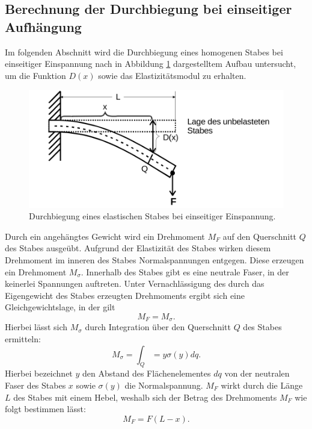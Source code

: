 \subsection{Berechnung der Durchbiegung bei einseitiger Aufhängung}
\label{sec:einseitigg}
Im folgenden Abschnitt wird die Durchbiegung eines homogenen Stabes bei einseitiger
Einspannung nach in Abbildung \ref{fig:einseitig} dargestelltem Aufbau untersucht,
um die Funktion $D(x)$ sowie das Elastizitätsmodul zu erhalten.
\begin{figure}[H]
  \centering
  \includegraphics[scale=0.4]{content/EinspannungEinseitig.png}
  \caption{Durchbiegung eines elastischen Stabes bei einseitiger Einspannung.}
  \label{fig:einseitig}
\end{figure}
\noindent
Durch ein angehängtes Gewicht wird ein Drehmoment $M_F$ auf den Querschnitt $Q$ des
Stabes ausgeübt. Aufgrund der Elastizität des Stabes wirken diesem Drehmoment im
inneren des Stabes Normalspannungen entgegen. Diese erzeugen ein Drehmoment $M_\sigma$.
Innerhalb des Stabes gibt es eine neutrale Faser, in der keinerlei Spannungen auftreten.
Unter Vernachlässigung des durch das Eigengewicht des Stabes erzeugten Drehmoments
ergibt sich eine Gleichgewichtslage, in der gilt
\begin{equation}
  M_F = M_\sigma .
  \label{eqn:momentengleichung1}
\end{equation}
Hierbei lässt sich $M_\sigma$ durch Integration über den Querschnitt $Q$ des Stabes
ermitteln:
\begin{equation}
  M_\sigma = \int_Q = y \sigma(y) dq.
  \label{eqn:msigma}
\end{equation}
Hierbei bezeichnet $y$ den Abstand des Flächenelementes $dq$ von der neutralen Faser
des Stabes $x$ sowie $\sigma(y)$ die Normalspannung.
$M_F$ wirkt durch die Länge $L$ des Stabes mit einem Hebel, weshalb sich der Betrag des Drehmoments
$M_F$ wie folgt bestimmen lässt:
\begin{equation}
  M_F = F(L - x).
  \label{eqn:mf}
\end{equation}
